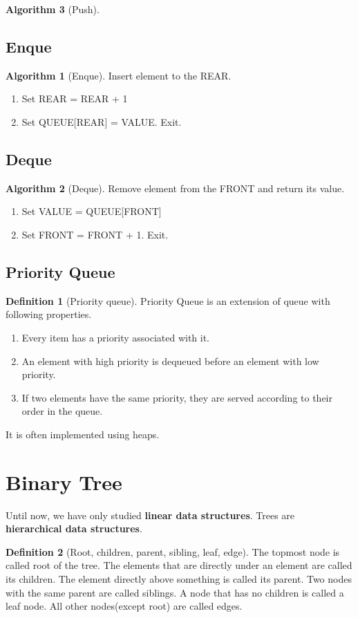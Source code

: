 \documentclass[10pt, a4paper]{extarticle}
\theoremstyle{definition}
\newtheorem{alg}{Algorithm}
\newtheorem{defn}{Definition}
\begin{document}
\begin{alg}[Push]
	\subsection{Enque}
	\begin{alg}[Enque]
		Insert element to the REAR.
		\begin{enumerate}
			\item Set REAR = REAR + 1
			\item Set QUEUE[REAR] = VALUE. Exit.
	\end{enumerate}
	\end{alg}
	\subsection{Deque}
	\begin{alg}[Deque]
		Remove element from the FRONT and return its value.
		\begin{enumerate}
			\item Set VALUE = QUEUE[FRONT]
			\item Set FRONT = FRONT + 1. Exit.
	\end{enumerate}
	\end{alg}
	
	\subsection{Priority Queue}
	\begin{defn}[Priority queue]
		Priority Queue is an extension of queue with following properties.
		\begin{enumerate}
			\item Every item has a priority associated with it.
			\item An element with high priority is dequeued before an element with low priority.
			\item If two elements have the same priority, they are served according to their order in the queue.
	\end{enumerate}
	It is often implemented using heaps.
	\end{defn}

	\section{Binary Tree}
	Until  now, we have only studied \textbf{linear data structures}. Trees are \textbf{hierarchical data structures}.
	\begin{defn}[Root, children, parent, sibling, leaf, edge]
		The topmost node is called root of the tree. The elements that are directly under an element are called its children. The element directly above something is called its parent. Two nodes with the same parent are called siblings. A node that has no children is called a leaf node. All other nodes(except root) are called edges.
	\end{defn}
	

\end{alg}
\end{document}
